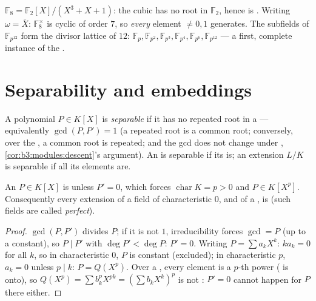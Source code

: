 \begin{example}\label{ex:b3:galois:f8}
$\mathbb F_8 = \mathbb F_2[X]/(X^3 + X + 1)$: the cubic has no
root in $\mathbb F_2$, hence is . Writing $\omega =
\bar X$: $\mathbb F_8^\times$ is cyclic of order $7$, so
\emph{every} element $\neq 0, 1$ generates. The subfields of
$\mathbb F_{p^{12}}$ form the divisor lattice of $12$:
$\mathbb F_p, \mathbb F_{p^2}, \mathbb F_{p^3}, \mathbb F_{p^4},
\mathbb F_{p^6}, \mathbb F_{p^{12}}$ --- a first, complete
instance of the .
\end{example}

\section{Separability and embeddings}

\begin{definition}\label{def:b3:galois:separable}
A polynomial $P \in K[X]$ is \emph{separable} if it has no repeated root in a  ---
equivalently $\gcd(P, P') = 1$ (a repeated root is a common
root; conversely, over the , a common root is
repeated; and the gcd does not change under ,
\cref{cor:b3:modules:descent}'s argument). An 
is separable if its  is; an extension $L/K$ is
separable if all its elements are.
\end{definition}

\begin{proposition}\label{prop:b3:galois:perfect}
An \emph{} $P \in K[X]$ is  unless $P' = 0$,
which forces $\operatorname{char} K = p > 0$ and $P \in K[X^p]$.
Consequently every  extension of a field of
characteristic $0$, and of a , is  (such
fields are called \emph{perfect}).
\end{proposition}

\begin{proof}
$\gcd(P, P')$ divides $P$; if it is not $1$, irreducibility
forces $\gcd = P$ (up to a constant), so $P \mid P'$ with $\deg
P' < \deg P$: $P' = 0$. Writing $P = \sum a_kX^k$: $ka_k = 0$
for all $k$, so in characteristic $0$, $P$ is constant (excluded);
in characteristic $p$, $a_k = 0$ unless $p \mid k$: $P =
Q(X^p)$. Over a , every element is a $p$-th power
( is onto), so $Q(X^p) = \sum b_k^p X^{pk} = (\sum
b_kX^k)^p$ is not : $P' = 0$ cannot happen for
 $P$ there either.
\end{proof}

